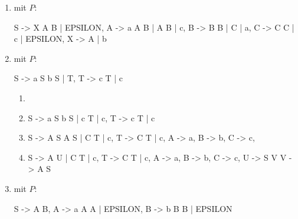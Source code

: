 \documentclass{bschlangaul-aufgabe}
\begin{document}
\begin{enumerate}

%

\item {} mit $P$:

\begin{bProduktionsRegeln}
S -> X A B | EPSILON,
A -> a A B | A B | c,
B -> B B | C | a,
C -> C C | c | EPSILON,
X -> A | b
\end{bProduktionsRegeln}

%

\item {} mit $P$:

\begin{bProduktionsRegeln}
S -> a S b S | T,
T -> c T | c
\end{bProduktionsRegeln}

\begin{bAntwort}
\begin{enumerate}
\item {}

\bNichtsZuTun

\item {}

\begin{bProduktionsRegeln}
S -> a S b S | c T | c,
T -> c T | c
\end{bProduktionsRegeln}

\item {}

\begin{bProduktionsRegeln}
S -> A S A S | C T | c,
T -> C T | c,
A -> a,
B -> b,
C -> c,
\end{bProduktionsRegeln}

\item {}

\begin{bProduktionsRegeln}
S -> A U | C T | c,
T -> C T | c,
A -> a,
B -> b,
C -> c,
U -> S V
V -> A S
\end{bProduktionsRegeln}

\end{enumerate}
\end{bAntwort}

%

\item {} mit $P$:

\begin{bProduktionsRegeln}
S -> A B,
A -> a A A | EPSILON,
B -> b B B | EPSILON
\end{bProduktionsRegeln}
\end{enumerate}
\end{document}
